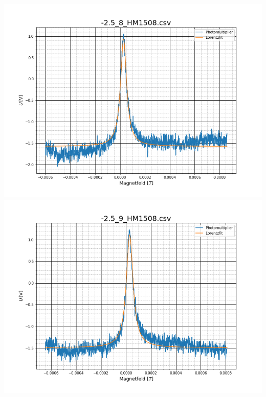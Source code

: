 \begin{center}
\includegraphics[scale=0.3]{Bild/Anhang/Statistik/stat9}
\includegraphics[scale=0.3]{Bild/Anhang/Statistik/stat10}\\


\end{center}
